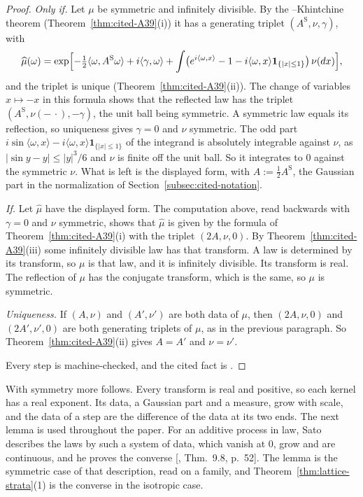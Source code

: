 \begin{proof}
\emph{Only if.} Let $\mu$ be symmetric and infinitely divisible. By the \Levy--Khintchine theorem
(Theorem~\ref{thm:cited-A39}(i)) it has a generating triplet $(A^{\mathrm S}, \nu, \gamma)$, with
\[
  \widehat\mu(\omega) = \exp\Bigl[-\tfrac12\langle\omega, A^{\mathrm S}\omega\rangle + i\langle\gamma, \omega\rangle
  + \int\bigl(e^{i\langle\omega, x\rangle} - 1 - i\langle\omega, x\rangle\mathbf 1_{\{|x| \le 1\}}\bigr)\,\nu(dx)\Bigr],
\]
and the triplet is unique (Theorem~\ref{thm:cited-A39}(ii)). The change of variables
$x \mapsto -x$ in this formula shows that the reflected law has the triplet
$(A^{\mathrm S}, \nu(-\,\cdot), -\gamma)$, the unit ball being symmetric. A symmetric law equals its
reflection, so uniqueness gives $\gamma = 0$ and $\nu$ symmetric. The odd part
$i\sin\langle\omega, x\rangle - i\langle\omega, x\rangle\mathbf 1_{\{|x| \le 1\}}$ of the integrand
is absolutely integrable against $\nu$, as $|\sin y - y| \le |y|^3/6$ and $\nu$ is finite off the
unit ball. So it integrates to $0$ against the symmetric $\nu$. What is left is the displayed form,
with $A := \tfrac12A^{\mathrm S}$, the Gaussian part in the normalization of
Section~\ref{subsec:cited-notation}.

\emph{If.} Let $\widehat\mu$ have the displayed form. The computation above, read backwards with
$\gamma = 0$ and $\nu$ symmetric, shows that $\widehat\mu$ is given by the formula of
Theorem~\ref{thm:cited-A39}(i) with the triplet $(2A, \nu, 0)$. By Theorem~\ref{thm:cited-A39}(iii)
some infinitely divisible law has that transform. A law is determined by its transform, so $\mu$ is
that law, and it is infinitely divisible. Its transform is real. The reflection of $\mu$ has the
conjugate transform, which is the same, so $\mu$ is symmetric.

\emph{Uniqueness.} If $(A, \nu)$ and $(A', \nu')$ are both data of $\mu$, then $(2A, \nu, 0)$ and
$(2A', \nu', 0)$ are both generating triplets of $\mu$, as in the previous paragraph. So
Theorem~\ref{thm:cited-A39}(ii) gives $A = A'$ and $\nu = \nu'$.

Every step is machine-checked, and the cited fact is .
\end{proof}

With symmetry more follows. Every transform is real and positive, so each kernel has a real
exponent. Its \Levy{} data, a Gaussian part and a \Levy{} measure, grow with scale, and the data of
a step are the difference of the data at its two ends. The next lemma is used throughout the paper.
For an additive process in law, Sato describes the laws by such a system of data, which vanish at
$0$, grow and are continuous, and he proves the converse [, Thm.~9.8, p.~52].
The lemma is the symmetric case of that description, read on a family, and
Theorem~\ref{thm:lattice-strata}(1) is the converse in the isotropic case.


